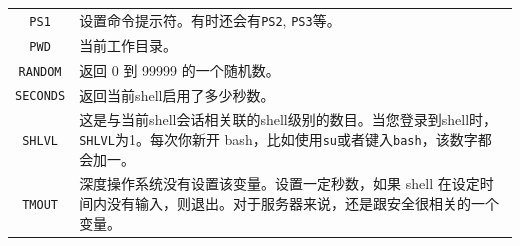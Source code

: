 \documentclass[doctor,openright,twoside]{sjtuthesis}
\newcommand{\passthrough}[1]{#1}
\theoremstyle{plain}
\theoremstyle{definition}
\theoremstyle{remark}
\theoremstyle{ocrenumbox}
\theoremstyle{plain}
\begin{document}
\begin{longtable}[]{@{}cl@{}}
\begin{minipage}[t]{0.23\columnwidth}
\passthrough{\lstinline!PS1!}\strut
\end{minipage} & \begin{minipage}[t]{0.72\columnwidth}\raggedright
设置命令提示符。有时还会有\passthrough{\lstinline!PS2!}, \passthrough{\lstinline!PS3!}等。\strut
\end{minipage}\tabularnewline
\begin{minipage}[t]{0.23\columnwidth}\centering
\passthrough{\lstinline!PWD!}\strut
\end{minipage} & \begin{minipage}[t]{0.72\columnwidth}\raggedright
当前工作目录。\strut
\end{minipage}\tabularnewline
\begin{minipage}[t]{0.23\columnwidth}\centering
\passthrough{\lstinline!RANDOM!}\strut
\end{minipage} & \begin{minipage}[t]{0.72\columnwidth}\raggedright
返回 0 到 99999 的一个随机数。\strut
\end{minipage}\tabularnewline
\begin{minipage}[t]{0.23\columnwidth}\centering
\passthrough{\lstinline!SECONDS!}\strut
\end{minipage} & \begin{minipage}[t]{0.72\columnwidth}\raggedright
返回当前shell启用了多少秒数。\strut
\end{minipage}\tabularnewline
\begin{minipage}[t]{0.23\columnwidth}\centering
\passthrough{\lstinline!SHLVL!}\strut
\end{minipage} & \begin{minipage}[t]{0.72\columnwidth}\raggedright
这是与当前shell会话相关联的shell级别的数目。当您登录到shell时，\passthrough{\lstinline!SHLVL!}为1。每次你新开 bash，比如使用\passthrough{\lstinline!su!}或者键入\passthrough{\lstinline!bash!}，该数字都会加一。\strut
\end{minipage}\tabularnewline
\begin{minipage}[t]{0.23\columnwidth}\centering
\passthrough{\lstinline!TMOUT!}\strut
\end{minipage} & \begin{minipage}[t]{0.72\columnwidth}\raggedright
深度操作系统没有设置该变量。设置一定秒数，如果 shell 在设定时间内没有输入，则退出。对于服务器来说，还是跟安全很相关的一个变量。\strut
\end{minipage}\tabularnewline
\bottomrule
\end{longtable}
\end{document}

